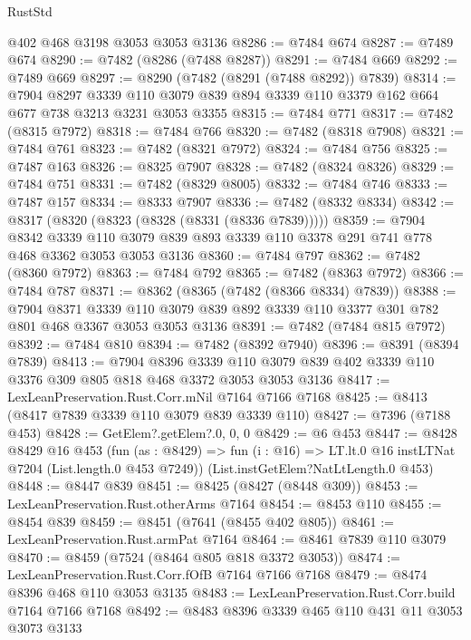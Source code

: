 \begin{lexlean}{RustStd}
\begin{coremodule}
{\begin{coremodule}
{{{{{{{{{{{{{{{{{{{{{{{{{{{{{{{{    @402
    @468
    @3198
    @3053
    @3053
    @3136
@8286 := @7484 @674
@8287 := @7489 @674
@8290 := @7482 (@8286 (@7488 @8287))
@8291 := @7484 @669
@8292 := @7489 @669
@8297 := @8290 (@7482 (@8291 (@7488 @8292)) @7839)
@8314 := @7904
    @8297
    @3339
    @110
    @3079
    @839
    @894
    @3339
    @110
    @3379
    @162
    @664
    @677
    @738
    @3213
    @3231
    @3053
    @3355
@8315 := @7484 @771
@8317 := @7482 (@8315 @7972)
@8318 := @7484 @766
@8320 := @7482 (@8318 @7908)
@8321 := @7484 @761
@8323 := @7482 (@8321 @7972)
@8324 := @7484 @756
@8325 := @7487 @163
@8326 := @8325 @7907
@8328 := @7482 (@8324 @8326)
@8329 := @7484 @751
@8331 := @7482 (@8329 @8005)
@8332 := @7484 @746
@8333 := @7487 @157
@8334 := @8333 @7907
@8336 := @7482 (@8332 @8334)
@8342 := @8317 (@8320 (@8323 (@8328 (@8331 (@8336 @7839)))))
@8359 := @7904
    @8342
    @3339
    @110
    @3079
    @839
    @893
    @3339
    @110
    @3378
    @291
    @741
    @778
    @468
    @3362
    @3053
    @3053
    @3136
@8360 := @7484 @797
@8362 := @7482 (@8360 @7972)
@8363 := @7484 @792
@8365 := @7482 (@8363 @7972)
@8366 := @7484 @787
@8371 := @8362 (@8365 (@7482 (@8366 @8334) @7839))
@8388 := @7904
    @8371
    @3339
    @110
    @3079
    @839
    @892
    @3339
    @110
    @3377
    @301
    @782
    @801
    @468
    @3367
    @3053
    @3053
    @3136
@8391 := @7482 (@7484 @815 @7972)
@8392 := @7484 @810
@8394 := @7482 (@8392 @7940)
@8396 := @8391 (@8394 @7839)
@8413 := @7904
    @8396
    @3339
    @110
    @3079
    @839
    @402
    @3339
    @110
    @3376
    @309
    @805
    @818
    @468
    @3372
    @3053
    @3053
    @3136
@8417 := LexLeanPreservation.Rust.Corr.mNil @7164 @7166 @7168
@8425 := @8413 (@8417 @7839 @3339 @110 @3079 @839 @3339 @110)
@8427 := @7396 (@7188 @453)
@8428 := GetElem?.getElem?.{0, 0, 0}
@8429 := @6 @453
@8447 := @8428
    @8429
    @16
    @453
    (fun (as : @8429) =>
    fun (i : @16) => LT.lt.{0} @16 instLTNat @7204 (List.length.{0} @453 @7249))
    (List.instGetElem?NatLtLength.{0} @453)
@8448 := @8447 @839
@8451 := @8425 (@8427 (@8448 @309))
@8453 := LexLeanPreservation.Rust.otherArms @7164
@8454 := @8453 @110
@8455 := @8454 @839
@8459 := @8451 (@7641 (@8455 @402 @805))
@8461 := LexLeanPreservation.Rust.armPat @7164
@8464 := @8461 @7839 @110 @3079
@8470 := @8459 (@7524 (@8464 @805 @818 @3372 @3053))
@8474 := LexLeanPreservation.Rust.Corr.fOfB @7164 @7166 @7168
@8479 := @8474 @8396 @468 @110 @3053 @3135
@8483 := LexLeanPreservation.Rust.Corr.build @7164 @7166 @7168
@8492 := @8483 @8396 @3339 @465 @110 @431 @11 @3053 @3073 @3133
}}}}}}}}}}}}}}}}}}}}}}}}}}}}}}}}
\end{coremodule}}
\end{coremodule}
\end{lexlean}
